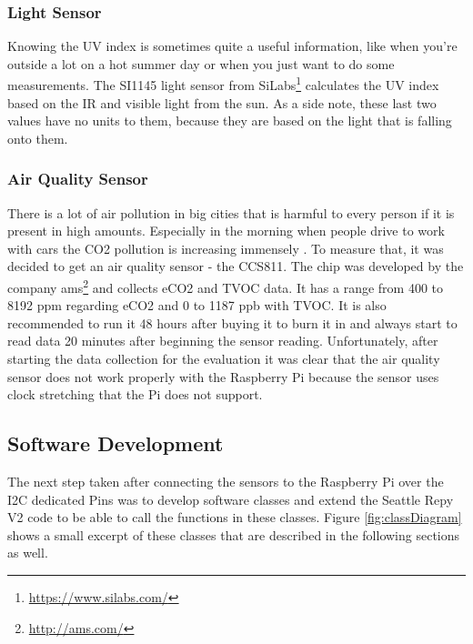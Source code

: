 \documentclass[bachelorthesis, grey, english]{mas-thesis-chapters} %
\begin{document}
\subsubsection{Light Sensor} 

Knowing the \gls{UV} index is sometimes quite a useful information, like when you're outside a lot on a hot summer day or when you just want to do some measurements. The SI1145 light sensor from SiLabs\footnote{\url{https://www.silabs.com/}} calculates the \gls{UV} index based on the \gls{IR} and visible light from the sun. As a side note, these last two values have no units to them, because they are based on the light that is falling onto them.  \cite{si1145}

\subsubsection{Air Quality Sensor} \label{sec:airQual}

There is a lot of air pollution in big cities that is harmful to every person if it is present in high amounts. Especially in the morning when people drive to work with cars the \gls{CO2} pollution is increasing immensely \cite{carWork}. To measure that, it was decided to get an air quality sensor - the CCS811. The chip was developed by the company ams\footnote{\url{http://ams.com/}} and collects \gls{eCO2} and \gls{TVOC} data. It has a range from  400 to 8192 \gls{ppm} regarding \gls{eCO2} and 0 to 1187 \gls{ppb} with \gls{TVOC}. It is also recommended to run it 48 hours after buying it to burn it in and always start to read data 20 minutes after beginning the sensor reading. Unfortunately, after starting the data collection for the evaluation it was clear that the air quality sensor does not work properly with the Raspberry Pi because the sensor uses clock stretching that the Pi does not support. \cite{ccs811}

\subsection{Software Development}

The next step taken after connecting the sensors to the Raspberry Pi over the \gls{I2C} dedicated Pins was to develop software classes and extend the Seattle \gls{Repy} V2 code to be able to call the functions in these classes. Figure \ref{fig:classDiagram} shows a small excerpt of these classes that are described in the following sections as well.
\end{document}
